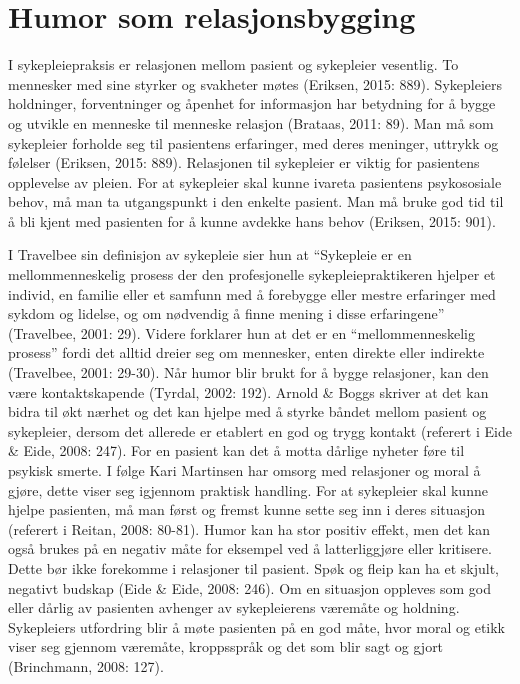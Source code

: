 \section{Humor som relasjonsbygging}

I sykepleiepraksis er relasjonen mellom pasient og sykepleier vesentlig. To
mennesker med sine styrker og svakheter møtes (Eriksen, 2015: 889). Sykepleiers
holdninger, forventninger og åpenhet for informasjon har betydning for å bygge
og utvikle en menneske til menneske relasjon (Brataas, 2011: 89). Man må som
sykepleier forholde seg til pasientens erfaringer, med deres meninger, uttrykk
og følelser (Eriksen, 2015: 889). Relasjonen til sykepleier er viktig for
pasientens opplevelse av pleien. For at sykepleier skal kunne ivareta
pasientens psykososiale behov, må man ta utgangspunkt i den enkelte pasient.
Man må bruke god tid til å bli kjent med pasienten for å kunne avdekke hans
behov (Eriksen, 2015: 901).

I Travelbee sin definisjon av sykepleie sier hun at “Sykepleie er en
mellommenneskelig prosess der den profesjonelle sykepleiepraktikeren hjelper et
individ, en familie eller et samfunn med å forebygge eller mestre erfaringer
med sykdom og lidelse, og om nødvendig å finne mening i disse erfaringene”
(Travelbee, 2001: 29). Videre forklarer hun at det er en “mellommenneskelig
prosess” fordi det alltid dreier seg om mennesker, enten direkte eller
indirekte (Travelbee, 2001: 29-30).  Når humor blir brukt for å bygge
relasjoner, kan den være kontaktskapende (Tyrdal, 2002: 192). Arnold \&{} Boggs
skriver at det kan bidra til økt nærhet og det kan hjelpe med å styrke båndet
mellom pasient og sykepleier, dersom det allerede er etablert en god og trygg
kontakt (referert i Eide \&{} Eide, 2008: 247).  For en pasient kan det å motta
dårlige nyheter føre til psykisk smerte. I følge Kari Martinsen har omsorg med
relasjoner og moral å gjøre, dette viser seg igjennom praktisk handling. For at
sykepleier skal kunne hjelpe pasienten, må man  først og fremst kunne sette seg
inn i deres situasjon (referert i Reitan, 2008: 80-81).  Humor kan ha stor
positiv effekt, men det kan også brukes på en negativ måte for eksempel ved å
latterliggjøre eller kritisere. Dette bør ikke forekomme i relasjoner til
pasient. Spøk og fleip kan ha et skjult, negativt budskap (Eide \&{} Eide, 2008:
246). Om en situasjon oppleves som god eller dårlig av pasienten avhenger av
sykepleierens væremåte og holdning. Sykepleiers utfordring blir å møte
pasienten på en god måte, hvor moral og etikk viser seg gjennom væremåte,
kroppsspråk og det som blir sagt og gjort (Brinchmann, 2008: 127).

